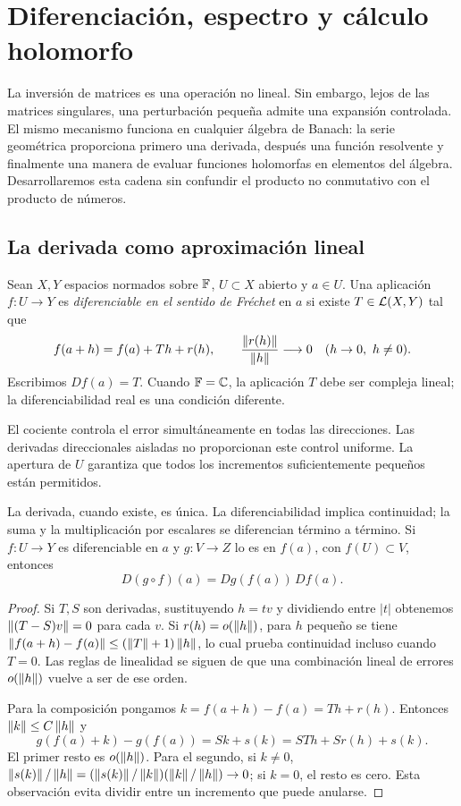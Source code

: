 \chapter{Diferenciación, espectro y cálculo holomorfo}\label{cap:v3-11}

La inversión de matrices es una operación no lineal. Sin embargo, lejos de las matrices singulares, una perturbación pequeña admite una expansión controlada. El mismo mecanismo funciona en cualquier álgebra de Banach: la serie geométrica proporciona primero una derivada, después una función resolvente y finalmente una manera de evaluar funciones holomorfas en elementos del álgebra. Desarrollaremos esta cadena sin confundir el producto no conmutativo con el producto de números.

\section{La derivada como aproximación lineal}\label{lec:v3-21}

\begin{definicion}
Sean $X,Y$ espacios normados sobre $\mathbb F$, $U\subset X$ abierto y $a\in U$. Una aplicación $f:U\to Y$ es \emph{diferenciable en el sentido de Fréchet} en $a$ si existe $T\in\mathcal L(X,Y)$ tal que
\[
 f(a+h)=f(a)+Th+r(h),\qquad
 \frac{\norm{r(h)}}{\norm h}\longrightarrow0\quad(h\to0,\ h\ne0).
\]
Escribimos $Df(a)=T$. Cuando $\mathbb F=\mathbb C$, la aplicación $T$ debe ser compleja lineal; la diferenciabilidad real es una condición diferente.
\end{definicion}

El cociente controla el error simultáneamente en todas las direcciones. Las derivadas direccionales aisladas no proporcionan este control uniforme. La apertura de $U$ garantiza que todos los incrementos suficientemente pequeños están permitidos.

\begin{proposicion}\label{v3:reglas-frechet}
La derivada, cuando existe, es única. La diferenciabilidad implica continuidad; la suma y la multiplicación por escalares se diferencian término a término. Si $f:U\to Y$ es diferenciable en $a$ y $g:V\to Z$ lo es en $f(a)$, con $f(U)\subset V$, entonces
\[
 D(g\circ f)(a)=Dg(f(a))\,Df(a).
\]
\end{proposicion}
\begin{proof}
Si $T,S$ son derivadas, sustituyendo $h=tv$ y dividiendo entre $|t|$ obtenemos $\left\lVert(T-S)v\right\rVert=0$ para cada $v$. Si $r(h)=o(\left\lVert h\right\rVert)$, para $h$ pequeño se tiene $\left\lVert f(a+h)-f(a)\right\rVert\le(\left\lVert T\right\rVert+1)\left\lVert h\right\rVert$, lo cual prueba continuidad incluso cuando $T=0$. Las reglas de linealidad se siguen de que una combinación lineal de errores $o(\left\lVert h\right\rVert)$ vuelve a ser de ese orden.

Para la composición pongamos $k=f(a+h)-f(a)=Th+r(h)$. Entonces $\left\lVert k\right\rVert\le C\left\lVert h\right\rVert$ y
\[
 g(f(a)+k)-g(f(a))=Sk+s(k)=STh+Sr(h)+s(k).
\]
El primer resto es $o(\left\lVert h\right\rVert)$. Para el segundo, si $k\ne0$,
$\left\lVert s(k)\right\rVert/\left\lVert h\right\rVert=(\left\lVert s(k)\right\rVert/\left\lVert k\right\rVert)(\left\lVert k\right\rVert/\left\lVert h\right\rVert)\to0$; si $k=0$, el resto es cero. Esta observación evita dividir entre un incremento que puede anularse.
\end{proof}

